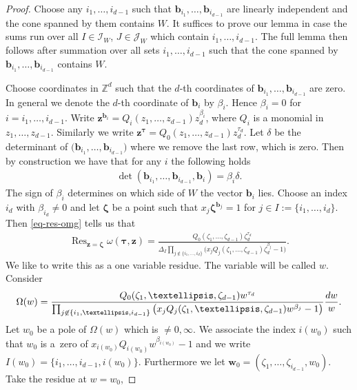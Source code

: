 \documentclass[11pt]{article}
\numberwithin{equation}{section}
\DeclareMathOperator*{\Res}{Res}
\numberwithin{equation}{section}
\begin{document}
\begin{proof}
Choose any $i_1,\dots,i_{d-1}$ such that $\bm{b}_{i_1},\dots,\bm{b}_{i_{d-1}}$ are linearly independent and the cone spanned by them contains $W$. It suffices to prove
our lemma in case the sums run over all $I\in\mathcal{I}_W$, $J\in\mathcal{J}_W$
which contain $i_1,\dots,i_{d-1}$. The full lemma then follows after summation over
all sets $i_1,\dots,i_{d-1}$ such that the cone spanned by $\bm{b}_{i_1},\dots,
\bm{b}_{i_{d-1}}$ contains $W$.

Choose coordinates in $\mathbb{Z}^d$ such that the $d$-th coordinates of
$\bm{b}_{i_1},\dots,\bm{b}_{i_{d-1}}$ are zero. In gene\-ral we denote the $d$-th
coordinate of $\bm{b}_i$ by $\beta_i$. Hence $\beta_i=0$ for $i=i_1,\dots,i_{d-1}$.
Write $\bm{z}^{\bm{b}_i} = Q_i(z_1,\dots,z_{d-1})z_d^{\beta_i}$, where $Q_i$ is a monomial in $z_1,\dots,z_{d-1}$. Similarly we write $\bm{z}^{\bm\tau}=Q_0(z_1,\dots,z_{d-1})
z_d^{\tau_d}$.
Let $\delta$ be the determinant of $\big(\bm{b}_{i_1},\dots,\bm{b}_{i_{d-1}}\big)$
where we remove the last row, which is zero.
Then by construction we have that for any $i$ the following holds
\begin{gather*}
\det\left(\bm{b}_{i_1},\dots,\bm{b}_{i_{d-1}},\bm{b}_i\right) = \beta_i \delta.
\end{gather*}
The sign of $\beta_i$ determines on which side of $W$ the vector $\bm{b}_i$ lies.
Choose an index $i_d$ with $\beta_{i_d}\ne0$ and let $\bm{\zeta}$ be a point such that
$x_j\bm{\zeta}^{\bm{b}_j} = 1$ for $j \in I:=\{i_1,\dots,i_d\}$. Then \eqref{eq-res-omg} tells us that
\begin{gather}\label{res-at-point}
\Res_{\bm{z}=\bm\zeta}\omega(\bm\tau,\bm{z})
=\frac{Q_0(\zeta_1,\dots,\zeta_{d-1})\zeta_d^{\tau_d}}
{\Delta_I\prod_{j \not \in \{i_1,\dots,i_d\}}
\big(x_jQ_j(\zeta_1,\dots,\zeta_{d-1})\zeta_d^{\beta_j} - 1\big)}.
\end{gather}
We like to write this as a one variable residue. The variable will be called $w$. Consider
\begin{gather*}
\Omega(w)=\frac{Q_0(\zeta_1,\dots,\zeta_{d-1})w^{\tau_d}}
{\prod_{j\not\in\{i_1,\dots,i_{d-1}\}}
\big(x_jQ_j(\zeta_1,\dots,\zeta_{d-1})w^{\beta_j}-1\big)}\frac{{\rm d}w}{w}.
\end{gather*}
Let $w_0$ be a pole of $\Omega(w)$ which is $\ne0,\infty$. We associate the index $i(w_0)$
such that $w_0$ is a~zero of $x_{i(w_0)}Q_{i(w_0)}w^{\beta_{i(w_0)}}-1$ and we write
$I(w_0)=\{i_1,\dots,i_{d-1},i(w_0)\}$. Furthermore we let $\bm{w}_0=
(\zeta_1,\dots,\zeta_{i_{d-1}},w_0)$. Take the residue at $w=w_0$,

\end{proof}
\end{document}
